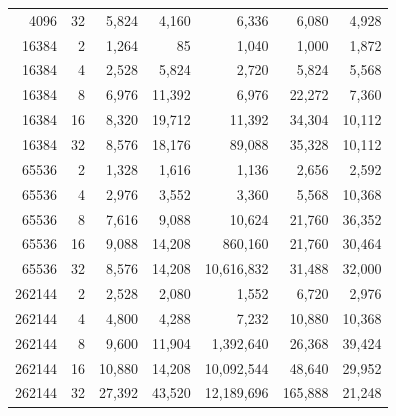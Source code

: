\begin{table}[!htbp]
\begin{tabular}{rrrrrrr}
4096 & 32 & 5{,}824 & 4{,}160 & 6{,}336 & 6{,}080 & 4{,}928 \\
16384 & 2 & 1{,}264 & 85 & 1{,}040 & 1{,}000 & 1{,}872 \\
16384 & 4 & 2{,}528 & 5{,}824 & 2{,}720 & 5{,}824 & 5{,}568 \\
16384 & 8 & 6{,}976 & 11{,}392 & 6{,}976 & 22{,}272 & 7{,}360 \\
16384 & 16 & 8{,}320 & 19{,}712 & 11{,}392 & 34{,}304 & 10{,}112 \\
16384 & 32 & 8{,}576 & 18{,}176 & 89{,}088 & 35{,}328 & 10{,}112 \\
65536 & 2 & 1{,}328 & 1{,}616 & 1{,}136 & 2{,}656 & 2{,}592 \\
65536 & 4 & 2{,}976 & 3{,}552 & 3{,}360 & 5{,}568 & 10{,}368 \\
65536 & 8 & 7{,}616 & 9{,}088 & 10{,}624 & 21{,}760 & 36{,}352 \\
65536 & 16 & 9{,}088 & 14{,}208 & 860{,}160 & 21{,}760 & 30{,}464 \\
65536 & 32 & 8{,}576 & 14{,}208 & 10{,}616{,}832 & 31{,}488 & 32{,}000 \\
262144 & 2 & 2{,}528 & 2{,}080 & 1{,}552 & 6{,}720 & 2{,}976 \\
262144 & 4 & 4{,}800 & 4{,}288 & 7{,}232 & 10{,}880 & 10{,}368 \\
262144 & 8 & 9{,}600 & 11{,}904 & 1{,}392{,}640 & 26{,}368 & 39{,}424 \\
262144 & 16 & 10{,}880 & 14{,}208 & 10{,}092{,}544 & 48{,}640 & 29{,}952 \\
262144 & 32 & 27{,}392 & 43{,}520 & 12{,}189{,}696 & 165{,}888 & 21{,}248 \\
\bottomrule
\end{tabular}
\end{table}
